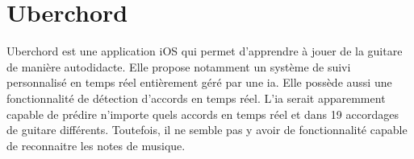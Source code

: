 \section{Uberchord}
\label{sec:1.2}

Uberchord est une application iOS qui permet d'apprendre à jouer de la guitare de manière autodidacte. Elle propose notamment un système de suivi personnalisé en temps réel entièrement géré par une \gls{ia}. Elle possède aussi une fonctionnalité de détection d'accords en temps réel. L'\gls{ia} serait apparemment capable de prédire n'importe quels accords en temps réel et dans 19 accordages de guitare différents. Toutefois, il ne semble pas y avoir de fonctionnalité capable de reconnaitre les notes de musique.